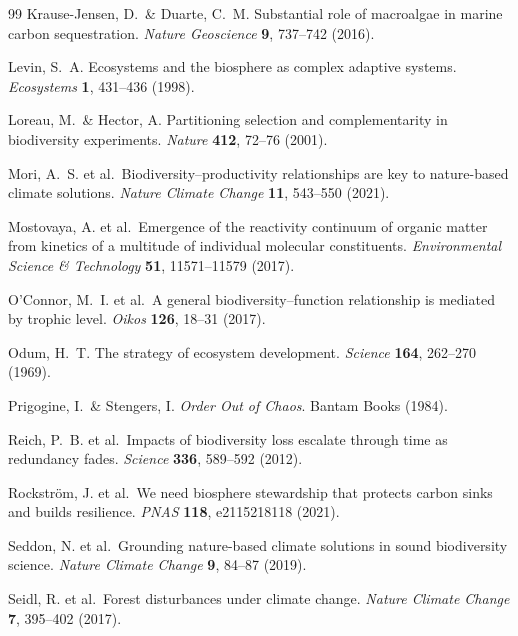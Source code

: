 \documentclass[12pt]{article}
\begin{document}
\begin{thebibliography}{99}
Krause-Jensen, D.\ \& Duarte, C.~M. Substantial role of macroalgae in marine carbon sequestration. \textit{Nature Geoscience} \textbf{9}, 737--742 (2016).

Levin, S.~A. Ecosystems and the biosphere as complex adaptive systems. \textit{Ecosystems} \textbf{1}, 431--436 (1998).

Loreau, M.\ \& Hector, A. Partitioning selection and complementarity in biodiversity experiments. \textit{Nature} \textbf{412}, 72--76 (2001).

Mori, A.~S. et al.\ Biodiversity--productivity relationships are key to nature-based climate solutions. \textit{Nature Climate Change} \textbf{11}, 543--550 (2021).

Mostovaya, A. et al.\ Emergence of the reactivity continuum of organic matter from kinetics of a multitude of individual molecular constituents. \textit{Environmental Science \& Technology} \textbf{51}, 11571--11579 (2017).

O'Connor, M.~I. et al.\ A general biodiversity--function relationship is mediated by trophic level. \textit{Oikos} \textbf{126}, 18--31 (2017).

Odum, H.~T. The strategy of ecosystem development. \textit{Science} \textbf{164}, 262--270 (1969).

Prigogine, I.\ \& Stengers, I. \textit{Order Out of Chaos}. Bantam Books (1984).

Reich, P.~B. et al.\ Impacts of biodiversity loss escalate through time as redundancy fades. \textit{Science} \textbf{336}, 589--592 (2012).

Rockstr\"{o}m, J. et al.\ We need biosphere stewardship that protects carbon sinks and builds resilience. \textit{PNAS} \textbf{118}, e2115218118 (2021).

Seddon, N. et al.\ Grounding nature-based climate solutions in sound biodiversity science. \textit{Nature Climate Change} \textbf{9}, 84--87 (2019).

Seidl, R. et al.\ Forest disturbances under climate change. \textit{Nature Climate Change} \textbf{7}, 395--402 (2017).


\end{thebibliography}
\end{document}
